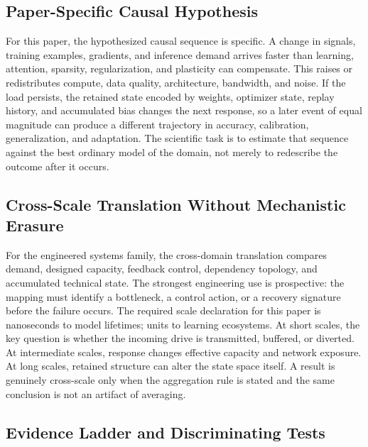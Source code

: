 \documentclass[12pt,a4paper]{article}
\begin{document}
\subsection{Paper-Specific Causal Hypothesis}

For this paper, the hypothesized causal sequence is specific. A change in
signals, training examples, gradients, and inference demand arrives faster than learning, attention, sparsity, regularization, and plasticity can compensate.
This raises or redistributes compute, data quality, architecture, bandwidth, and noise. If the load persists,
the retained state encoded by weights, optimizer state, replay history, and accumulated bias changes the next response, so a later event of equal
magnitude can produce a different trajectory in accuracy, calibration, generalization, and adaptation. The
scientific task is to estimate that sequence against the best ordinary model of
the domain, not merely to redescribe the outcome after it occurs.

\subsection{Cross-Scale Translation Without Mechanistic Erasure}

For the engineered systems family, the cross-domain translation compares demand, designed capacity, feedback control, dependency topology, and accumulated technical state. The strongest engineering use is prospective: the mapping must identify a bottleneck, a control action, or a recovery signature before the failure occurs. \cite{BarabasiAlbert1999,WattsStrogatz1998,Shannon1948,BakTangWiesenfeld1987}
The required scale declaration for this paper is nanoseconds to model lifetimes; units to learning ecosystems. At short
scales, the key question is whether the incoming drive is transmitted,
buffered, or diverted. At intermediate scales, response changes effective
capacity and network exposure. At long scales, retained structure can alter the
state space itself. A result is genuinely cross-scale only when the aggregation
rule is stated and the same conclusion is not an artifact of averaging.

\subsection{Evidence Ladder and Discriminating Tests}
\end{document}
